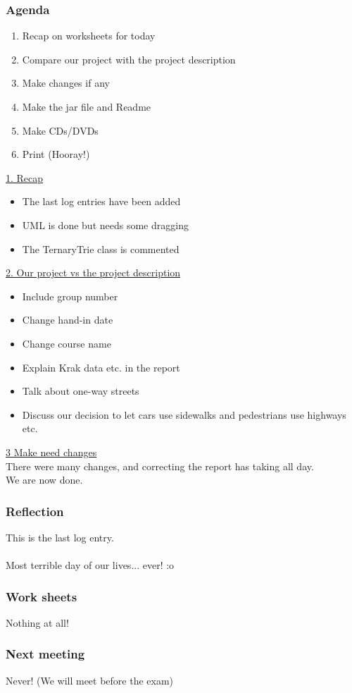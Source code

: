 \subsubsection*{Agenda}
\begin{enumerate}
	\item Recap on worksheets for today
	\item Compare our project with the project description
	\item Make changes if any
	\item Make the jar file and Readme
	\item Make CDs/DVDs
	\item Print (Hooray!)
\end{enumerate}
\underline{1. Recap}
\begin{itemize}
	\item The last log entries have been added
	\item UML is done but needs some dragging
	\item The TernaryTrie class is commented
\end{itemize}
\underline{2. Our project vs the project description} \\
\begin{itemize}
	\item Include group number 
	\item Change hand-in date
	\item Change course name
	\item Explain Krak data etc. in the report
	\item Talk about one-way streets
	\item Discuss our decision to let cars use sidewalks and pedestrians use highways etc.
\end{itemize}
\underline{3 Make need changes} \\
There were many changes, and correcting the report has taking all day. \\
We are now done.

\subsubsection*{Reflection}
This is the last log entry. \\ \\
Most terrible day of our lives... ever! :o

\subsubsection*{Work sheets}
Nothing at all!

\subsubsection*{Next meeting}
Never! (We will meet before the exam)